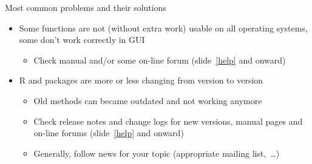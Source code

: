 \documentclass[compress, ucs, xelatex, 11pt, xcolor=svgnames,
  hyperref={
    bookmarks=true,
    unicode=true,
    colorlinks=true,
    pdftitle={Molecular data in R},
    plainpages=false,
    pdfauthor={Vojtech Zeisek},
    pdfsubject={Course about phylogeny and evolution in R},
    pdfcreator={XeLaTeX},
    pdfkeywords={R, evolution, phylogeny, molecular data},
    linkcolor=Tomato,
    anchorcolor=SaddleBrown,
    citecolor=Goldenrod,
    filecolor=DarkMagenta,
    menucolor=Sienna,
    urlcolor=DarkTurquoise,
    pdftex},
  url={hyphens, lowtilde} %
  ]{beamer}
\begin{document}
\begin{frame}[allowframebreaks]{Most common problems and their solutions}
\begin{itemize}
\begin{itemize}
    \end{itemize}
    \item Some functions are not (without extra work) usable on all operating systems, some don't work correctly in GUI
    \begin{itemize}
      \item Check manual and/or some on-line forum (slide~\ref{help} and onward)
    \end{itemize}
    \item R and packages are more or less changing from version to version
    \begin{itemize}
      \item Old methods can became outdated and not working anymore
      \item Check release notes and change logs for new versions, manual pages and on-line forums (slide~\ref{help} and onward)
      \item Generally, follow news for your topic (appropriate mailing list,~\ldots)
    \end{itemize}
  \end{itemize}
\end{frame}
\end{document}
